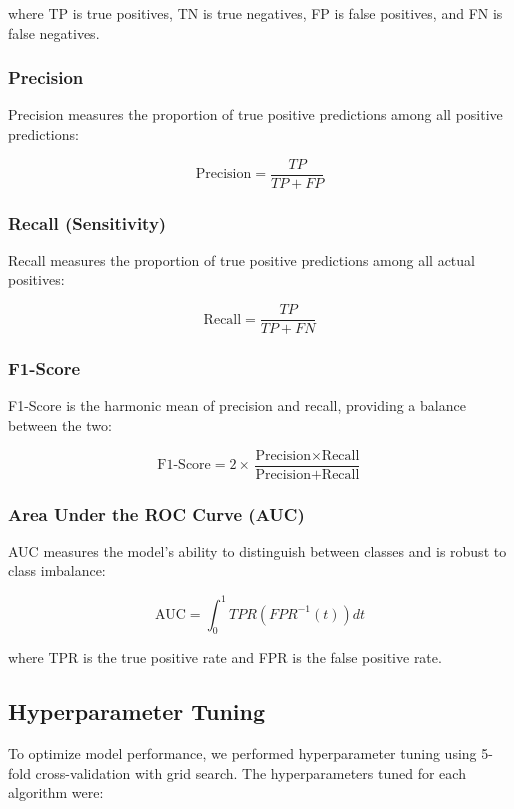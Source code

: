 \documentclass[conference]{IEEEtran}
\begin{document}
\begin{itemize}
where TP is true positives, TN is true negatives, FP is false positives, and FN is false negatives.

\subsubsection{Precision}
Precision measures the proportion of true positive predictions among all positive predictions:

\begin{equation}
\text{Precision} = \frac{TP}{TP + FP}
\end{equation}

\subsubsection{Recall (Sensitivity)}
Recall measures the proportion of true positive predictions among all actual positives:

\begin{equation}
\text{Recall} = \frac{TP}{TP + FN}
\end{equation}

\subsubsection{F1-Score}
F1-Score is the harmonic mean of precision and recall, providing a balance between the two:

\begin{equation}
\text{F1-Score} = 2 \times \frac{\text{Precision} \times \text{Recall}}{\text{Precision} + \text{Recall}}
\end{equation}

\subsubsection{Area Under the ROC Curve (AUC)}
AUC measures the model's ability to distinguish between classes and is robust to class imbalance:

\begin{equation}
\text{AUC} = \int_{0}^{1} TPR(FPR^{-1}(t)) dt
\end{equation}

where TPR is the true positive rate and FPR is the false positive rate.

\subsection{Hyperparameter Tuning}
To optimize model performance, we performed hyperparameter tuning using 5-fold cross-validation with grid search. The hyperparameters tuned for each algorithm were:


\end{itemize}
\end{document}
